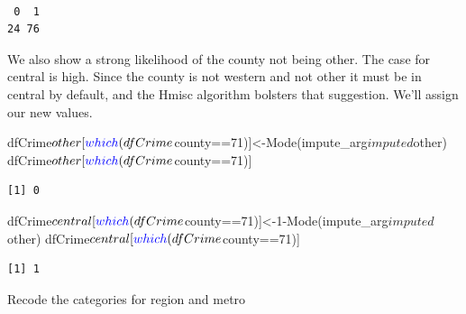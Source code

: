 \documentclass[]{article}
\newenvironment{Shaded}{}{}
\newcommand{\DecValTok}[1]{#1}
\newcommand{\KeywordTok}[1]{\textcolor[rgb]{0.00,0.00,1.00}{#1}}
\newcommand{\NormalTok}[1]{#1}
\newcommand{\OperatorTok}[1]{#1}
\begin{document}
\begin{verbatim}

 0  1 
24 76 
\end{verbatim}

We also show a strong likelihood of the county not being other. The case
for central is high. Since the county is not western and not other it
must be in central by default, and the Hmisc algorithm bolsters that
suggestion. We'll assign our new values.

\begin{Shaded}
\begin{Highlighting}[]
\NormalTok{dfCrime}\OperatorTok{$}\NormalTok{other[}\KeywordTok{which}\NormalTok{(dfCrime}\OperatorTok{$}\NormalTok{county}\OperatorTok{==}\DecValTok{71}\NormalTok{)]<-}\KeywordTok{Mode}\NormalTok{(impute_arg}\OperatorTok{$}\NormalTok{imputed}\OperatorTok{$}\NormalTok{other)}
\NormalTok{dfCrime}\OperatorTok{$}\NormalTok{other[}\KeywordTok{which}\NormalTok{(dfCrime}\OperatorTok{$}\NormalTok{county}\OperatorTok{==}\DecValTok{71}\NormalTok{)]}
\end{Highlighting}
\end{Shaded}

\begin{verbatim}
[1] 0
\end{verbatim}

\begin{Shaded}
\begin{Highlighting}[]
\NormalTok{dfCrime}\OperatorTok{$}\NormalTok{central[}\KeywordTok{which}\NormalTok{(dfCrime}\OperatorTok{$}\NormalTok{county}\OperatorTok{==}\DecValTok{71}\NormalTok{)]<-}\DecValTok{1}\OperatorTok{-}\KeywordTok{Mode}\NormalTok{(impute_arg}\OperatorTok{$}\NormalTok{imputed}\OperatorTok{$}\NormalTok{other)}
\NormalTok{dfCrime}\OperatorTok{$}\NormalTok{central[}\KeywordTok{which}\NormalTok{(dfCrime}\OperatorTok{$}\NormalTok{county}\OperatorTok{==}\DecValTok{71}\NormalTok{)]}
\end{Highlighting}
\end{Shaded}

\begin{verbatim}
[1] 1
\end{verbatim}

Recode the categories for region and metro
\end{document}
